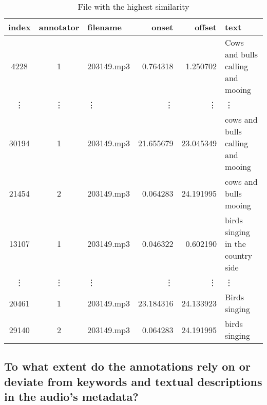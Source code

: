 \begin{table}[h]
  \caption{File with the highest similarity}
  \label{tab:highest similarity}
  \centering
  \begin{tabular}{cclrrp{6cm}}
    \toprule
    index & annotator & filename & onset & offset & text \\
    \midrule
    4228 & 1 & 203149.mp3 & 0.764318 & 1.250702 & Cows and bulls calling and mooing \\
    \vdots & \vdots & \vdots & \vdots & \vdots & \vdots \\
    30194 & 1 & 203149.mp3 & 21.655679 & 23.045349 & cows and bulls calling and mooing \\
    21454 & 2 & 203149.mp3 & 0.064283 & 24.191995 & cows and bulls mooing \\
    13107 & 1 & 203149.mp3 & 0.046322 & 0.602190 & birds singing in the country side \\
    \vdots & \vdots & \vdots & \vdots & \vdots & \vdots \\
    20461 & 1 & 203149.mp3 & 23.184316 & 24.133923 & Birds singing \\
    29140 & 2 & 203149.mp3 & 0.064283 & 24.191995 & birds singing \\
    \bottomrule
  \end{tabular}
\end{table}


\subsection{To what extent do the annotations rely on or deviate from keywords and textual descriptions in the audio’s metadata?}
\label{sec:Case Study:b}

